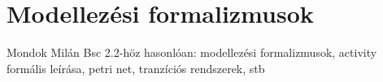 \section{Modellezési formalizmusok}


Mondok Milán Bsc 2.2-höz hasonlóan: modellezési formalizmusok, activity formális leírása, petri net, tranzíciós rendszerek, stb